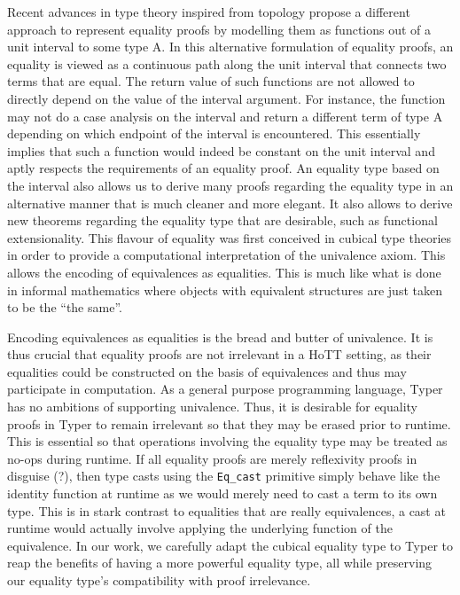 \documentclass[12pt,twoside,maitrise]{dms}
\theoremstyle{definition}
\numberwithin{equation}{section}
\numberwithin{table}{chapter}
\numberwithin{figure}{chapter}
\newcommand\fn[1] {\texttt{#1}}
\begin{document}
Recent advances in type theory inspired from topology propose a different
approach to represent equality proofs by modelling them as functions out of a
unit interval to some type A. In this alternative formulation of equality
proofs, an equality is viewed as a continuous path along the unit interval that
connects two terms that are equal. The return value of such functions are not
allowed to directly depend on the value of the interval argument. For instance,
the function may not do a case analysis on the interval and return a different
term of type A depending on which endpoint of the interval is encountered. This
essentially implies that such a function would indeed be constant on the unit
interval and aptly respects the requirements of an equality proof. An equality
type based on the interval also allows us to derive many proofs regarding the
equality type in an alternative manner that is much cleaner and more elegant. It
also allows to derive new theorems regarding the equality type that are
desirable, such as functional extensionality. This flavour of equality was first
conceived in cubical type theories in order to provide a computational
interpretation of the univalence axiom\cite{bezem2014model}. This allows the
encoding of equivalences as equalities. This is much like what is done in
informal mathematics where objects with equivalent structures are just taken to
be the ``the same''.

Encoding equivalences as equalities is the bread and butter of univalence. It is
thus crucial that equality proofs are not irrelevant in a HoTT setting, as their
equalities could be constructed on the basis of equivalences and thus may
participate in computation. As a general purpose programming language, Typer has
no ambitions of supporting univalence. Thus, it is desirable for equality proofs
in Typer to remain irrelevant so that they may be erased prior to runtime. This
is essential so that operations involving the equality type may be treated as
no-ops during runtime. If all equality proofs are merely reflexivity proofs in
disguise (?), then type casts using the \fn{Eq\_cast} primitive simply behave
like the identity function at runtime as we would merely need to cast a term to
its own type. This is in stark contrast to equalities that are really
equivalences, a cast at runtime would actually involve applying the underlying
function of the equivalence. In our work, we carefully adapt the cubical
equality type to Typer to reap the benefits of having a more powerful equality
type, all while preserving our equality type's compatibility with proof
irrelevance.
\end{document}
